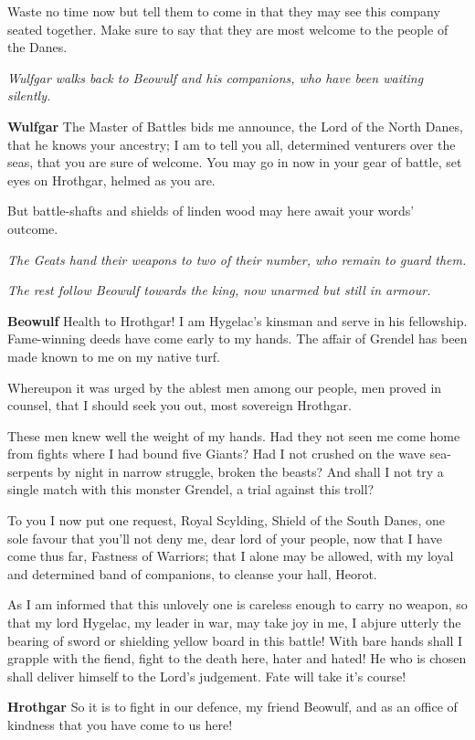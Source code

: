 \documentclass[a4paper]{article}
\begin{document}
{Waste no time now but tell them to come in
that they may see this company seated together.
Make sure to say that they are most welcome
to the people of the Danes.

\centerline{\textit{Wulfgar walks back to Beowulf and his companions, who have been waiting silently.}}

\textbf{Wulfgar} The Master of Battles bids me announce,
the Lord of the North Danes, that he knows your ancestry;
I am to tell you all, determined venturers
over the seas, that you are sure of welcome.
You may go in now in your gear of battle,
set eyes on Hrothgar, helmed as you are.

But battle-shafts and shields of linden wood
may here await your words' outcome.

\centerline{\textit{The Geats hand their weapons to two of their number, who remain to guard them.}}
\centerline{\textit{The rest follow Beowulf towards the king, now unarmed but still in armour.}}

\textbf{Beowulf} Health to Hrothgar! I am Hygelac's kinsman
and serve in his fellowship. Fame-winning deeds
have come early to my hands. The affair of Grendel
has been made known to me on my native turf.

Whereupon it was urged by the ablest men
among our people, men proved in counsel,
that I should seek you out, most sovereign Hrothgar.

These men knew well the weight of my hands.
Had they not seen me come home from fights
where I had bound five Giants?
Had I not crushed on the wave
sea-serpents by night in narrow struggle,
broken the beasts? And shall I not try
a single match with this monster Grendel,
a trial against this troll?

To you I now
put one request, Royal Scylding,
Shield of the South Danes, one sole favour
that you'll not deny me, dear lord of your people,
now that I have come thus far, Fastness of Warriors;
that I alone may be allowed, with my loyal and determined
band of companions, to cleanse your hall, Heorot.

As I am informed that this unlovely one
is careless enough to carry no weapon,
so that my lord Hygelac, my leader in war,
may take joy in me, I abjure utterly
the bearing of sword or shielding yellow
board in this battle! With bare hands shall I
grapple with the fiend, fight to the death here,
hater and hated! He who is chosen
shall deliver himself to the Lord's judgement.
Fate will take it's course!

\textbf{Hrothgar} So it is to fight in our defence, my friend Beowulf,
and as an office of kindness that you have come to us here!

}
\end{document}
